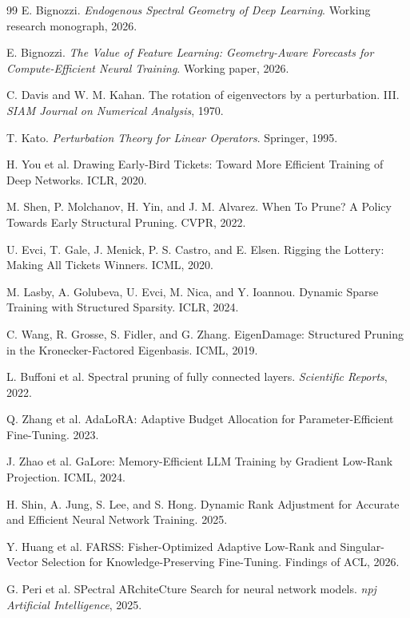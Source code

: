 \begin{thebibliography}{99}
E. Bignozzi. \emph{Endogenous Spectral Geometry of Deep Learning}. Working research monograph, 2026.

E. Bignozzi. \emph{The Value of Feature Learning: Geometry-Aware Forecasts for Compute-Efficient Neural Training}. Working paper, 2026.

C. Davis and W. M. Kahan. The rotation of eigenvectors by a perturbation. III. \emph{SIAM Journal on Numerical Analysis}, 1970.

T. Kato. \emph{Perturbation Theory for Linear Operators}. Springer, 1995.

H. You et al. Drawing Early-Bird Tickets: Toward More Efficient Training of Deep Networks. ICLR, 2020.

M. Shen, P. Molchanov, H. Yin, and J. M. Alvarez. When To Prune? A Policy Towards Early Structural Pruning. CVPR, 2022.

U. Evci, T. Gale, J. Menick, P. S. Castro, and E. Elsen. Rigging the Lottery: Making All Tickets Winners. ICML, 2020.

M. Lasby, A. Golubeva, U. Evci, M. Nica, and Y. Ioannou. Dynamic Sparse Training with Structured Sparsity. ICLR, 2024.

C. Wang, R. Grosse, S. Fidler, and G. Zhang. EigenDamage: Structured Pruning in the Kronecker-Factored Eigenbasis. ICML, 2019.

L. Buffoni et al. Spectral pruning of fully connected layers. \emph{Scientific Reports}, 2022.

Q. Zhang et al. AdaLoRA: Adaptive Budget Allocation for Parameter-Efficient Fine-Tuning. 2023.

J. Zhao et al. GaLore: Memory-Efficient LLM Training by Gradient Low-Rank Projection. ICML, 2024.

H. Shin, A. Jung, S. Lee, and S. Hong. Dynamic Rank Adjustment for Accurate and Efficient Neural Network Training. 2025.

Y. Huang et al. FARSS: Fisher-Optimized Adaptive Low-Rank and Singular-Vector Selection for Knowledge-Preserving Fine-Tuning. Findings of ACL, 2026.

G. Peri et al. SPectral ARchiteCture Search for neural network models. \emph{npj Artificial Intelligence}, 2025.
\end{thebibliography}

